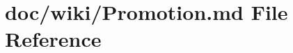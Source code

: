 \hypertarget{_promotion_8md}{}\section{doc/wiki/\+Promotion.md File Reference}
\label{_promotion_8md}
